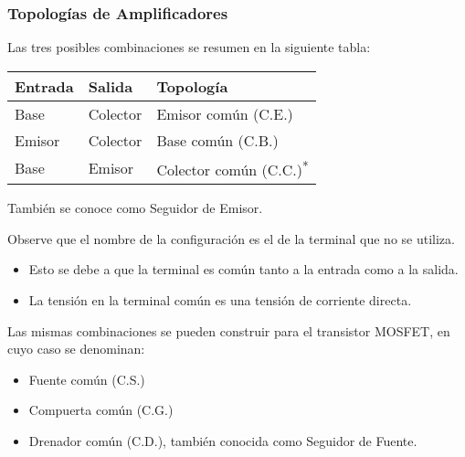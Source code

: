 \begin{frame}[t]
    \frametitle{Topologías de Amplificadores}

    Las tres posibles combinaciones se resumen en la siguiente tabla:

    \begin{table}[H]
        \centering
        \begin{tabular}{lll}
            \hline Entrada & Salida & Topología \\
            \hline Base    & Colector & Emisor común (C.E.) \\
            Emisor         & Colector & Base común (C.B.) \\
            Base           & Emisor   & Colector común (C.C.)\textsuperscript{*} \\
            \hline
        \end{tabular}

        \footnotesize *También se conoce como Seguidor de Emisor.
    \end{table}

    Observe que el nombre de la configuración es el de la terminal que no se utiliza.

    \begin{itemize}
        \item Esto se debe a que la terminal es común tanto a la entrada como a la salida.
        \item La tensión en la terminal común es una tensión de corriente directa.
    \end{itemize}

    \vspace{3mm}
    Las mismas combinaciones se pueden construir para el transistor MOSFET, en cuyo caso se denominan:

    \begin{itemize}
        \item Fuente común (C.S.)
        \item Compuerta común (C.G.)
        \item Drenador común (C.D.), también conocida como Seguidor de Fuente.
    \end{itemize}
\end{frame}

